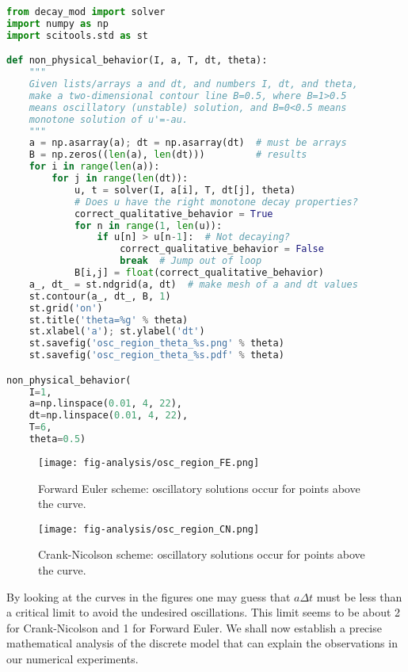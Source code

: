 \documentclass[graybox,sectrefs,envcountresetchap,open=right,final]{svmonodo}
\begin{document}
\begin{lstlisting}[language=python,style=blue1bar_bluegreen]
from decay_mod import solver
import numpy as np
import scitools.std as st

def non_physical_behavior(I, a, T, dt, theta):
    """
    Given lists/arrays a and dt, and numbers I, dt, and theta,
    make a two-dimensional contour line B=0.5, where B=1>0.5
    means oscillatory (unstable) solution, and B=0<0.5 means
    monotone solution of u'=-au.
    """
    a = np.asarray(a); dt = np.asarray(dt)  # must be arrays
    B = np.zeros((len(a), len(dt)))         # results
    for i in range(len(a)):
        for j in range(len(dt)):
            u, t = solver(I, a[i], T, dt[j], theta)
            # Does u have the right monotone decay properties?
            correct_qualitative_behavior = True
            for n in range(1, len(u)):
                if u[n] > u[n-1]:  # Not decaying?
                    correct_qualitative_behavior = False
                    break  # Jump out of loop
            B[i,j] = float(correct_qualitative_behavior)
    a_, dt_ = st.ndgrid(a, dt)  # make mesh of a and dt values
    st.contour(a_, dt_, B, 1)
    st.grid('on')
    st.title('theta=%g' % theta)
    st.xlabel('a'); st.ylabel('dt')
    st.savefig('osc_region_theta_%s.png' % theta)
    st.savefig('osc_region_theta_%s.pdf' % theta)

non_physical_behavior(
    I=1,
    a=np.linspace(0.01, 4, 22),
    dt=np.linspace(0.01, 4, 22),
    T=6,
    theta=0.5)

\end{lstlisting}


\begin{figure}[!ht]  %
  \centerline{\texttt{[image: fig-analysis/osc\_region\_FE.png]}}
  \caption{
  Forward Euler scheme: oscillatory solutions occur for points above the curve. \label{decay:analysis:B:FE}
  }
\end{figure}

\begin{figure}[!ht]  %
  \centerline{\texttt{[image: fig-analysis/osc\_region\_CN.png]}}
  \caption{
  Crank-Nicolson scheme: oscillatory solutions occur for points above the curve. \label{decay:analysis:B:CN}
  }
\end{figure}

By looking at the curves in the figures one may guess that $a\Delta t$
must be less than a critical limit to avoid the undesired
oscillations.  This limit seems to be about 2 for Crank-Nicolson and 1
for Forward Euler.  We shall now establish a precise mathematical
analysis of the discrete model that can explain the observations in
our numerical experiments.
\end{document}
